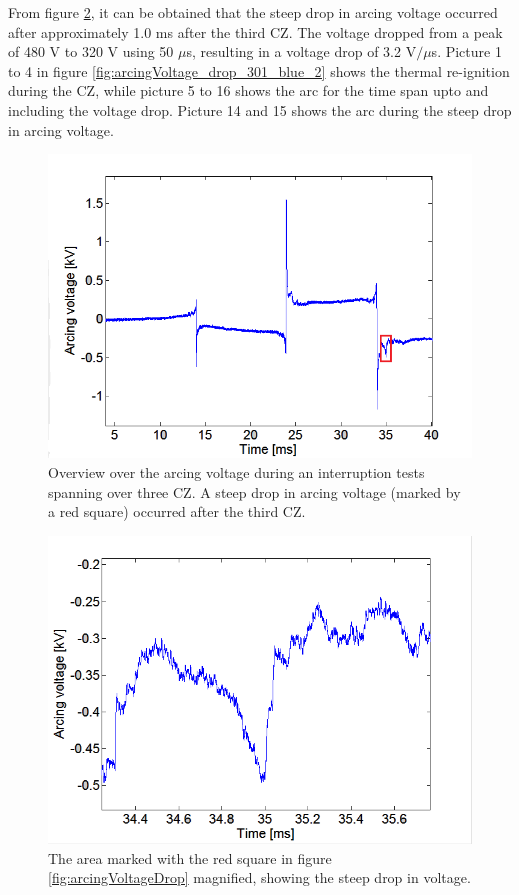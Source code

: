 \documentclass[10pt,b5paper,twoside]{article}
\begin{document}
From figure \ref{fig:arcingVoltageDrop_zoomed_2}, it can be obtained that the steep drop in arcing voltage occurred after approximately 1.0 ms after the third CZ. The voltage dropped from a peak of 480 V to 320 V using 50 $\mu$s, resulting in a voltage drop of 3.2 V$/  \mu$s. Picture 1 to 4 in figure \ref{fig:arcingVoltage_drop_301_blue_2} shows the thermal re-ignition during the CZ, while picture 5 to 16 shows the arc for the time span upto and including the voltage drop. Picture 14 and 15 shows the arc during the steep drop in arcing voltage.

\begin{figure}[H]
\centering
\includegraphics[scale=0.6, angle =0 ]{Bilder/Results/overviewArcingVoltageDrop_2.PNG}
\caption{Overview over the arcing voltage during an interruption tests spanning over three CZ. A steep drop in arcing voltage (marked by a red square) occurred after the third CZ.} \label{fig:arcingVoltageDrop_2}
\end{figure}

\begin{figure}[H]
\centering
\includegraphics[scale=0.6, angle =0 ]{Bilder/Results/zoomArcingVoltageDrop_2.PNG}
\caption{The area marked with the red square in figure \ref{fig:arcingVoltageDrop} magnified, showing the steep drop in voltage.} \label{fig:arcingVoltageDrop_zoomed_2}
\end{figure}
\end{document}
